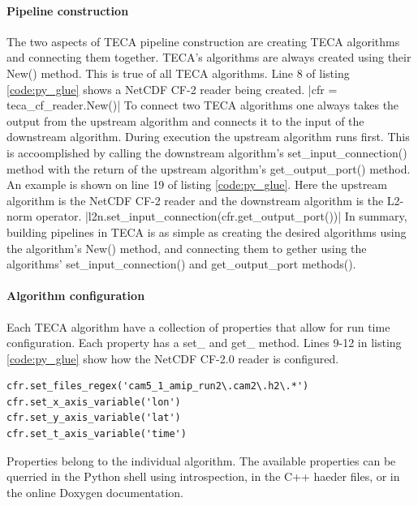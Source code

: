 \documentclass[a4paper,10pt,DIV=12]{scrreprt}
\begin{document}
\paragraph{Pipeline construction}
The two aspects of TECA pipeline construction are creating TECA algorithms and connecting them together. TECA's algorithms are always created using their New() method. This is true of all TECA algorithms. Line 8 of listing \ref{code:py_glue} shows a NetCDF CF-2 reader being created. |cfr = teca_cf_reader.New()| To connect two TECA algorithms one always takes the output from the upstream algorithm and connects it to the input of the downstream algorithm. During execution the upstream algorithm runs first. This is accoomplished by calling the downstream algorithm's set\_input\_connection() method with the return of the upstream algorithm's get\_output\_port() method. An example is shown on line 19 of listing \ref{code:py_glue}. Here the upstream algorithm is the NetCDF CF-2 reader and the downstream algorithm is the L2-norm operator. |l2n.set_input_connection(cfr.get_output_port())| In summary, building pipelines in TECA is as simple as creating the desired algorithms using the algorithm's New() method, and connecting them to gether using the algorithms' set\_input\_connection() and get\_output\_port methods().

\paragraph{Algorithm configuration}
Each TECA algorithm have a collection of properties that allow for run time configuration. Each property has a set\_ and get\_ method. Lines 9-12 in listing \ref{code:py_glue} show how the NetCDF CF-2.0 reader is configured.
\begin{verbatim}
cfr.set_files_regex('cam5_1_amip_run2\.cam2\.h2\.*')
cfr.set_x_axis_variable('lon')
cfr.set_y_axis_variable('lat')
cfr.set_t_axis_variable('time')
\end{verbatim}
Properties belong to the individual algorithm. The available properties can be querried in the Python shell using introspection, in the C++ haeder files, or in the online Doxygen documentation.
\end{document}
